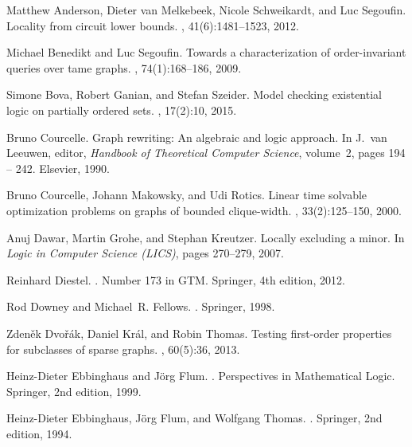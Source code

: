 \documentclass[12pt]{amsart}
\begin{document}
\begin{thebibliography}{10}

Matthew Anderson, Dieter van Melkebeek, Nicole Schweikardt, and Luc Segoufin.
\newblock Locality from circuit lower bounds.
, 41(6):1481--1523, 2012.

Michael Benedikt and Luc Segoufin.
\newblock Towards a characterization of order-invariant queries over tame
  graphs.
, 74(1):168--186, 2009.

Simone Bova, Robert Ganian, and Stefan Szeider.
\newblock Model checking existential logic on partially ordered sets.
, 17(2):10, 2015.

Bruno Courcelle.
\newblock Graph rewriting: An algebraic and logic approach.
\newblock In J.~{van Leeuwen}, editor, {\em Handbook of Theoretical Computer
  Science}, volume~2, pages 194 -- 242. Elsevier, 1990.

Bruno Courcelle, Johann Makowsky, and Udi Rotics.
\newblock Linear time solvable optimization problems on graphs of bounded
  clique-width.
, 33(2):125--150, 2000.

Anuj Dawar, Martin Grohe, and Stephan Kreutzer.
\newblock Locally excluding a minor.
\newblock In {\em Logic in Computer Science (LICS)}, pages 270--279, 2007.

Reinhard Diestel.
.
\newblock Number 173 in GTM. Springer, 4th edition, 2012.

Rod Downey and Michael~R. Fellows.
.
\newblock Springer, 1998.

Zden{\v{e}}k Dvo{\v{r}}{\'a}k, Daniel Kr{\'a}l, and Robin Thomas.
\newblock Testing first-order properties for subclasses of sparse graphs.
, 60(5):36, 2013.

Heinz-Dieter Ebbinghaus and Jörg Flum.
.
\newblock Perspectives in Mathematical Logic. Springer, 2nd edition, 1999.

Heinz-Dieter Ebbinghaus, Jörg Flum, and Wolfgang Thomas.
.
\newblock Springer, 2nd edition, 1994.


\end{thebibliography}
\end{document}
